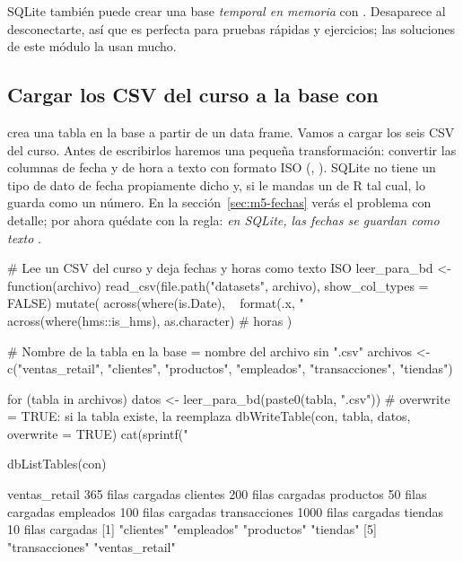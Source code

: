 \begin{consejo}
SQLite también puede crear una base \emph{temporal en memoria} con
. Desaparece al
desconectarte, así que es perfecta para pruebas rápidas y ejercicios; las
soluciones de este módulo la usan mucho.
\end{consejo}

\subsection{Cargar los CSV del curso a la base con \texorpdfstring{}{dbWriteTable()}}

 crea una tabla en la base a
partir de un data frame. Vamos a cargar los seis CSV del curso. Antes de
escribirlos haremos una pequeña transformación: convertir las columnas de
fecha y de hora a texto con formato ISO (,
). SQLite no tiene un tipo de dato de fecha propiamente
dicho y, si le mandas un  de R tal cual, lo guarda como un
número. En la sección~\ref{sec:m5-fechas} verás el problema con detalle; por
ahora quédate con la regla: \emph{en SQLite, las fechas se guardan como texto
}.

\begin{rcode}
# Lee un CSV del curso y deja fechas y horas como texto ISO
leer_para_bd <- function(archivo) {
  read_csv(file.path("datasets", archivo), show_col_types = FALSE) %
    mutate(
      across(where(is.Date), ~ format(.x, "%
      across(where(hms::is_hms), as.character)          # horas
    )
}

# Nombre de la tabla en la base = nombre del archivo sin ".csv"
archivos <- c("ventas_retail", "clientes", "productos",
              "empleados", "transacciones", "tiendas")

for (tabla in archivos) {
  datos <- leer_para_bd(paste0(tabla, ".csv"))
  # overwrite = TRUE: si la tabla existe, la reemplaza
  dbWriteTable(con, tabla, datos, overwrite = TRUE)
  cat(sprintf("%
}

dbListTables(con)
\end{rcode}

\begin{rsalida}
ventas_retail    365 filas cargadas
clientes         200 filas cargadas
productos         50 filas cargadas
empleados        100 filas cargadas
transacciones   1000 filas cargadas
tiendas           10 filas cargadas
[1] "clientes"      "empleados"     "productos"     "tiendas"      
[5] "transacciones" "ventas_retail"
\end{rsalida}

